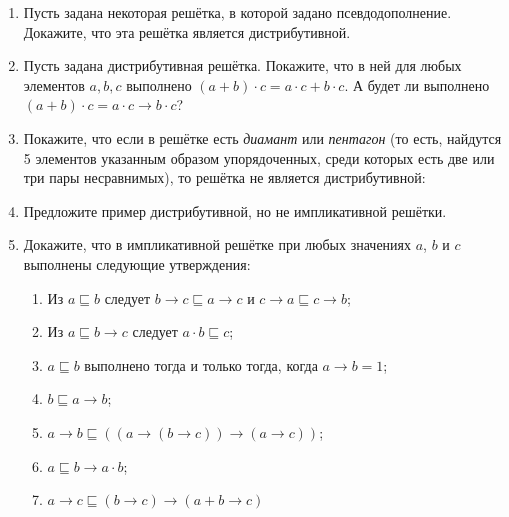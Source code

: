 \documentclass[10pt,a4paper,oneside]{article}
\begin{document}
\begin{enumerate}

\item Пусть задана некоторая решётка, в которой задано псевдодополнение.
Докажите, что эта решётка является дистрибутивной.

\item Пусть задана дистрибутивная решётка. Покажите, что в ней для любых элементов 
$a,b,c$ выполнено $(a+b)\cdot c = a\cdot c + b \cdot c$.
А будет ли выполнено $(a+b)\cdot c = a\cdot c \rightarrow b \cdot c$?

\item Покажите, что если в решётке есть \emph{диамант} или \emph{пентагон}
(то есть, найдутся 5 элементов указанным образом упорядоченных, среди которых есть две или 
три пары несравнимых), то решётка не является дистрибутивной:
\begin{center}\end{center}

\item Предложите пример дистрибутивной, но не импликативной решётки.

\item Докажите, что в импликативной решётке при любых значениях $a$, $b$ и $c$ 
выполнены следующие утверждения:

\begin{enumerate}
\item Из $a \sqsubseteq b$ следует $b\to c \sqsubseteq a\to c$ и $c\to a \sqsubseteq c \to b$;
\item Из $a \sqsubseteq b \to c$ следует $a \cdot b \sqsubseteq c$;
\item $a \sqsubseteq b$ выполнено тогда и только тогда, когда $a \to b = 1$;
\item $b \sqsubseteq a \rightarrow b$;
\item $a \rightarrow b \sqsubseteq ((a \rightarrow (b \rightarrow c)) \rightarrow (a \rightarrow c))$;
\item $a \sqsubseteq b \rightarrow a \cdot b$;
\item $a \rightarrow c \sqsubseteq (b \rightarrow c) \rightarrow (a + b \rightarrow c)$
\end{enumerate}


\end{enumerate}
\end{document}
